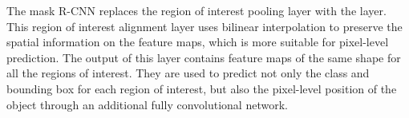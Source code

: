 The mask R-CNN replaces the region of interest pooling layer with the  layer.
This region of interest alignment layer uses bilinear interpolation to preserve the spatial information on the feature maps, which is more suitable for pixel-level prediction.
The output of this layer contains feature maps of the same shape for all the regions of interest.
They are used to predict not only the class and bounding box for each region of interest, but also the pixel-level position of the object through an additional fully convolutional network.

